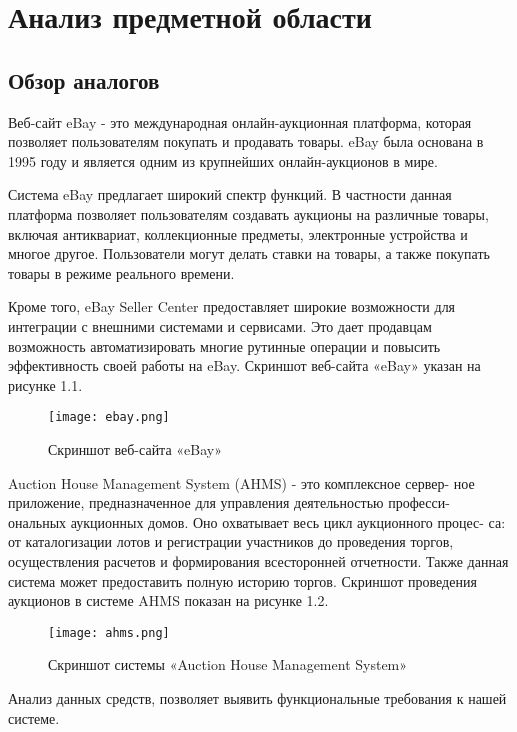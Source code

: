\section{Анализ предметной области}

\subsection{Обзор аналогов}

Веб-сайт eBay - это международная онлайн-аукционная платформа, 
которая позволяет пользователям покупать и продавать товары. 
eBay была основана в 1995 году и является одним из крупнейших онлайн-аукционов в мире.

Система eBay предлагает широкий спектр функций.
В частности данная платформа позволяет пользователям создавать аукционы на различные товары, 
включая антиквариат, коллекционные предметы, электронные устройства и многое другое. 
Пользователи могут делать ставки на товары, а также покупать товары в режиме реального времени.

Кроме того, eBay Seller Center предоставляет широкие возможности для интеграции 
с внешними системами и сервисами. 
Это дает продавцам возможность автоматизировать многие рутинные операции и повысить эффективность своей работы на eBay.
Скриншот веб-сайта «eBay» указан на рисунке 1.1.

\begin{figure}[ht]
\centering
    \texttt{[image: ebay.png]}
    \caption{Скриншот веб-сайта «eBay»}
\end{figure}

Auction House Management System (AHMS) - это комплексное сервер-
ное приложение, предназначенное для управления деятельностью професси-
ональных аукционных домов. Оно охватывает весь цикл аукционного процес-
са: от каталогизации лотов и регистрации участников до проведения торгов,
осуществления расчетов и формирования всесторонней отчетности.
Также данная система может предоставить полную историю торгов.
Скриншот проведения аукционов в системе AHMS показан на рисунке 1.2.


\begin{figure}[h]
\centering
\texttt{[image: ahms.png]}
\caption{Скриншот системы «Auction House Management System»}
\end{figure}
Анализ данных средств, позволяет выявить функциональные требования к нашей системе.

